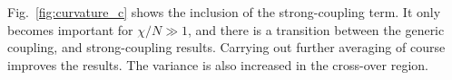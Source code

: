 Fig.~\ref{fig:curvature_c} shows the inclusion of the strong-coupling term.  It only becomes important for $\chi/N\gg 1$,
and there is a transition between the generic coupling, and strong-coupling results.  Carrying out 
further averaging of course improves the results.   The variance is also increased in the cross-over region.






